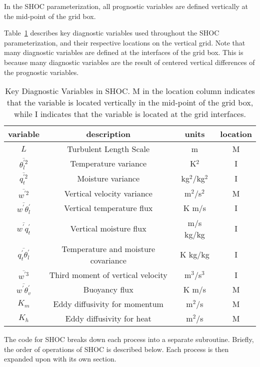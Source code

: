 In the SHOC parameterization, all prognostic variables are defined vertically at the mid-point of the grid box.  

Table~\ref{table:diagnostic} describes key diagnostic variables used throughout the SHOC parameterization, and their respective locations on the vertical grid.  Note that many diagnostic variables are defined at the interfaces of the grid box.  This is because many diagnostic variables are the result of centered vertical differences of the prognostic variables.  

\begin{table}[ht]
\caption{Key Diagnostic Variables in SHOC.  M in the location column indicates that the variable is located vertically in the mid-point of the grid box, while I indicates that the variable is located at the grid interfaces.}
\centering
\begin{tabular}{c c c c}
\hline\hline
variable & description & units & location \\
\hline
$L$ & Turbulent Length Scale & m & M \\
$\overline{\theta_{l}^{'2}}$ & Temperature variance & K$^2$ & I \\
$\overline{q_{t}^{'2}}$ & Moisture variance & kg$^2$/kg$^2$ & I \\
$\overline{w^{'2}}$ & Vertical velocity variance & m$^2$/s$^2$ & M \\
$\overline{w^{'}\theta_{l}^{'}}$ & Vertical temperature flux & K m/s & I \\
$\overline{w^{'}q_{t}^{'}}$ & Vertical moisture flux & m/s kg/kg & I \\
$\overline{q_{t}^{'}\theta_{l}^{'}}$ & Temperature and moisture covariance & K kg/kg & I \\
$\overline{w^{'3}}$ & Third moment of vertical velocity &  m$^3$/s$^3$ & I \\
$\overline{w^{'}\theta_{v}^{'}}$ & Buoyancy flux & K m/s & M \\
$K_{m}$ & Eddy diffusivity for momentum & m$^2$/s & M \\
$K_{h}$ & Eddy diffusivity for heat & m$^2$/s & M \\
\hline
\end{tabular}
\label{table:diagnostic}
\end{table}  

The code for SHOC breaks down each process into a separate subroutine.  Briefly, the order of operations of SHOC is described below.  Each process is then expanded upon with its own section.

